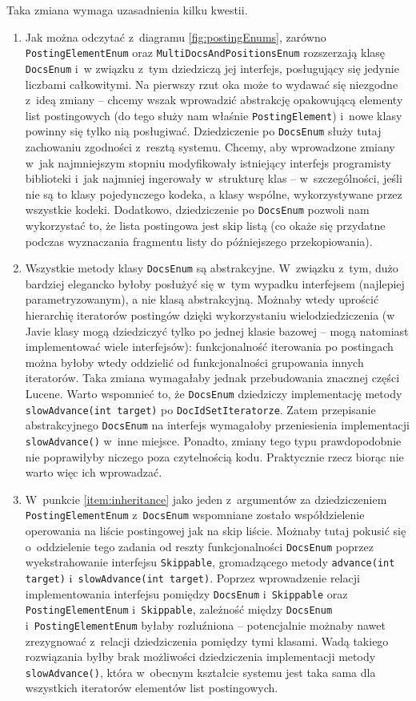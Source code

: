 Taka zmiana wymaga uzasadnienia kilku kwestii.
\begin{enumerate}
 \item \label{item:inheritance} Jak można odczytać z~diagramu \ref{fig:postingEnums}, zarówno \texttt{PostingElementEnum} oraz \texttt{MultiDocsAndPositionsEnum} rozszerzają klasę \texttt{DocsEnum} i~w związku z~tym dziedziczą jej interfejs, posługujący się jedynie liczbami całkowitymi. Na pierwszy rzut oka może to wydawać się niezgodne z~ideą zmiany -- chcemy wszak wprowadzić abstrakcję opakowującą elementy list postingowych (do tego służy nam właśnie \texttt{PostingElement}) i~nowe klasy powinny się tylko nią posługiwać. Dziedziczenie po \texttt{DocsEnum} służy tutaj zachowaniu zgodności z~resztą systemu. Chcemy, aby wprowadzone zmiany w~jak najmniejszym stopniu modyfikowały istniejący interfejs programisty biblioteki i~jak najmniej ingerowały w~strukturę klas -- w~szczególności, jeśli nie są to klasy pojedynczego kodeka, a klasy wspólne, wykorzystywane przez wszystkie kodeki. Dodatkowo, dziedziczenie po \texttt{DocsEnum} pozwoli nam wykorzystać to, że lista postingowa jest skip listą (co okaże się przydatne podczas wyznaczania fragmentu listy do późniejszego przekopiowania).
 \item Wszystkie metody klasy \texttt{DocsEnum} są abstrakcyjne. W~związku z~tym, dużo bardziej elegancko byłoby posłużyć się w~tym wypadku interfejsem (najlepiej parametryzowanym), a nie klasą abstrakcyjną. Możnaby wtedy uprościć hierarchię iteratorów postingów dzięki wykorzystaniu wielodziedziczenia (w Javie klasy mogą dziedziczyć tylko po jednej klasie bazowej -- mogą natomiast implementować wiele interfejsów): funkcjonalność iterowania po postingach można byłoby wtedy oddzielić od funkcjonalności grupowania innych iteratorów. Taka zmiana wymagałaby jednak przebudowania znacznej części Lucene. Warto wspomnieć to, że \texttt{DocsEnum} dziedziczy implementację metody \texttt{slowAdvance(int target)} po \texttt{DocIdSetIteratorze}. Zatem przepisanie abstrakcyjnego \texttt{DocsEnum} na interfejs wymagałoby przeniesienia implementacji \texttt{slowAdvance()} w~inne miejsce. Ponadto, zmiany tego typu prawdopodobnie nie poprawiłyby niczego poza czytelnością kodu. Praktycznie rzecz biorąc nie warto więc ich wprowadzać.
 \item W~punkcie \ref{item:inheritance} jako jeden z~argumentów za dziedziczeniem \texttt{PostingElementEnum} z~\texttt{DocsEnum} wspomniane zostało współdzielenie operowania na liście postingowej jak na skip liście. Możnaby tutaj pokusić się o~oddzielenie tego zadania od reszty funkcjonalności \texttt{DocsEnum} poprzez wyekstrahowanie interfejsu \texttt{Skippable}, gromadzącego metody \texttt{advance(int target)} i~\texttt{slowAdvance(int target)}. Poprzez wprowadzenie relacji implementowania interfejsu pomiędzy \texttt{DocsEnum} i~\texttt{Skippable} oraz \texttt{PostingElementEnum} i~\texttt{Skippable}, zależność między \texttt{DocsEnum} i~\texttt{PostingElementEnum} byłaby rozluźniona -- potencjalnie możnaby nawet zrezygnować z~relacji dziedziczenia pomiędzy tymi klasami. Wadą takiego rozwiązania byłby brak możliwości dziedziczenia implementacji metody \texttt{slowAdvance()}, która w~obecnym kształcie systemu jest taka sama dla wszystkich iteratorów elementów list postingowych.

\end{enumerate}
